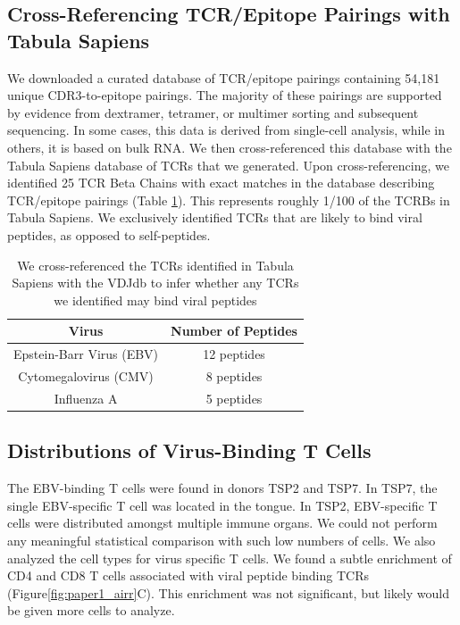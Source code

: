 \subsection{Cross-Referencing TCR/Epitope Pairings with Tabula Sapiens}

We downloaded a curated database of TCR/epitope pairings containing 54,181 unique CDR3-to-epitope pairings. The majority of these pairings are supported by evidence from dextramer, tetramer, or multimer sorting and subsequent sequencing. In some cases, this data is derived from single-cell analysis, while in others, it is based on bulk RNA. We then cross-referenced this database with the Tabula Sapiens database of TCRs that we generated. Upon cross-referencing, we identified 25 TCR Beta Chains with exact matches in the database describing TCR/epitope pairings (Table \ref{tab:paper1_tab1_viral_peptides}). This represents roughly 1/100 of the TCRBs in Tabula Sapiens. We exclusively identified TCRs that are likely to bind viral peptides, as opposed to self-peptides.

\renewcommand{\arraystretch}{2}  %
\begin{table}[hbt!]
\centering
\begin{tabularx}{\textwidth}{cc}  %
   \textbf{Virus} & \textbf{Number of Peptides} \\
   \hline  %
Epstein-Barr Virus (EBV) & 12 peptides \\
\hline
 Cytomegalovirus (CMV) & 8 peptides \\
\hline
Influenza A & 5 peptides \\
\hline
\end{tabularx}
\caption[Table of TCR-Binding Inferences]{We cross-referenced the TCRs identified in Tabula Sapiens with the VDJdb to infer whether any TCRs we identified may bind viral peptides}
\label{tab:paper1_tab1_viral_peptides}
\end{table}

\subsection{Distributions of Virus-Binding T Cells}
The EBV-binding T cells were found in donors TSP2 and TSP7. In TSP7, the single EBV-specific T cell was located in the tongue. In TSP2, EBV-specific T cells were distributed amongst multiple immune organs. We could not perform any meaningful statistical comparison with such low numbers of cells. We also analyzed the cell types for virus specific T cells. We found a subtle enrichment of CD4 and CD8 T cells associated with viral peptide binding TCRs (Figure\ref{fig:paper1_airr}C). This enrichment was not significant, but likely would be given more cells to analyze.

